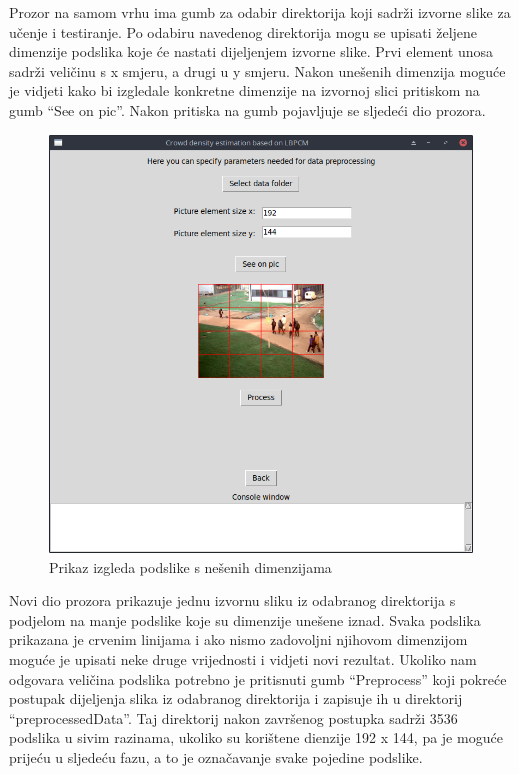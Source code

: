 \documentclass[times, utf8, zavrsni]{fer}
\begin{document}
Prozor na samom vrhu ima gumb za odabir direktorija koji sadrži izvorne slike
za učenje i testiranje. Po odabiru navedenog direktorija mogu se upisati 
željene dimenzije podslika koje će nastati dijeljenjem izvorne slike.
Prvi element unosa sadrži veličinu s x smjeru, a drugi u y smjeru. Nakon
unešenih dimenzija moguće je vidjeti kako bi izgledale konkretne dimenzije
na izvornoj slici pritiskom na gumb \enquote{See on pic}. Nakon pritiska na gumb
pojavljuje se sljedeći dio prozora.

\begin{figure}[ht]
\centering
\includegraphics[scale=0.4]{img/seeonpic.png}
\caption{Prikaz izgleda podslike s nešenih dimenzijama}
\end{figure}

Novi dio prozora prikazuje jednu izvornu sliku iz odabranog direktorija
s podjelom na manje podslike koje su dimenzije unešene iznad. Svaka podslika
prikazana je crvenim linijama i ako nismo zadovoljni njihovom dimenzijom
moguće je upisati neke druge vrijednosti i vidjeti novi rezultat. Ukoliko 
nam odgovara veličina podslika potrebno je pritisnuti gumb \enquote{Preprocess}
koji pokreće postupak dijeljenja slika iz odabranog direktorija i zapisuje ih u 
direktorij \enquote{preprocessedData}. Taj direktorij nakon završenog postupka
sadrži 3536 podslika u sivim razinama, ukoliko su korištene dienzije 192 x 144, 
pa je moguće prijeću u sljedeću fazu, a to je označavanje svake pojedine podslike.
\end{document}
